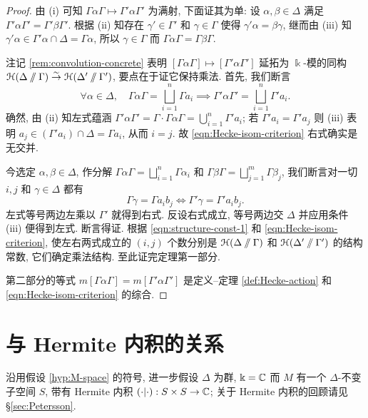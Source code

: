 \begin{proof}
	由 (i) 可知 $\Gamma\alpha\Gamma \mapsto \Gamma' \alpha\Gamma'$ 为满射, 下面证其为单: 设 $\alpha,\beta \in \Delta$ 满足 $\Gamma'\alpha\Gamma' = \Gamma'\beta\Gamma'$. 根据 (ii) 知存在 $\gamma' \in \Gamma'$ 和 $\gamma \in \Gamma$ 使得 $\gamma'\alpha = \beta\gamma$, 继而由 (iii) 知 $\gamma'\alpha \in \Gamma'\alpha \cap \Delta = \Gamma\alpha$, 所以 $\gamma \in \Gamma$ 而 $\Gamma\alpha\Gamma = \Gamma\beta\Gamma$.
	
	注记 \ref{rem:convolution-concrete} 表明 $[\Gamma\alpha\Gamma] \mapsto [\Gamma'\alpha\Gamma']$ 延拓为 $\Bbbk$-模的同构 $\EuScript{H}(\Delta \sslash \Gamma) \stackrel{\sim}{\rightarrow} \EuScript{H}(\Delta' \sslash \Gamma')$, 要点在于证它保持乘法. 首先, 我们断言
	\begin{equation}\label{eqn:Hecke-isom-criterion}
		\forall \alpha \in \Delta, \quad \Gamma \alpha \Gamma = \bigsqcup_{i=1}^n \Gamma a_i \implies \Gamma' \alpha \Gamma' = \bigsqcup_{i=1}^n \Gamma' a_i.
	\end{equation}
	确然, 由 (ii) 知左式蕴涵 $\Gamma' \alpha \Gamma' = \Gamma \cdot \Gamma\alpha\Gamma = \bigcup_{i=1}^n \Gamma' a_i$; 若 $\Gamma' a_i = \Gamma' a_j$ 则 (iii) 表明 $a_j \in (\Gamma' a_i) \cap \Delta = \Gamma a_i$, 从而 $i=j$. 故 \eqref{eqn:Hecke-isom-criterion} 右式确实是无交并.
	
	今选定 $\alpha, \beta \in \Delta$, 作分解 $\Gamma\alpha\Gamma = \bigsqcup_{i=1}^n \Gamma \alpha_i$ 和 $\Gamma\beta\Gamma = \bigsqcup_{j=1}^m \Gamma\beta_j$, 我们断言对一切 $i, j$ 和 $\gamma \in \Delta$ 都有
	\[ \Gamma \gamma = \Gamma a_i b_j \iff \Gamma' \gamma = \Gamma' a_i b_j. \]
	左式等号两边左乘以 $\Gamma'$ 就得到右式. 反设右式成立, 等号两边交 $\Delta$ 并应用条件 (iii) 便得到左式. 断言得证. 根据 \eqref{eqn:structure-const-1} 和 \eqref{eqn:Hecke-isom-criterion}, 使左右两式成立的 $(i,j)$ 个数分别是 $\EuScript{H}(\Delta \sslash \Gamma)$ 和 $\EuScript{H}(\Delta' \sslash \Gamma')$ 的结构常数, 它们确定乘法结构. 至此证完定理第一部分.
	
	第二部分的等式 $m [\Gamma \alpha \Gamma] = m[\Gamma'\alpha\Gamma']$ 是定义--定理 \ref{def:Hecke-action} 和 \eqref{eqn:Hecke-isom-criterion} 的综合.
\end{proof}

\section{与 Hermite 内积的关系}\label{sec:Hermitian-form}
沿用假设 \ref{hyp:M-space} 的符号, 进一步假设 $\Delta$ 为群, $\Bbbk=\mathbb{C}$ 而 $M$ 有一个 $\Delta$-不变子空间 $S$, 带有 Hermite 内积 $\left( \cdot \middle| \cdot \right): S \times S \to \mathbb{C}$; 关于 Hermite 内积的回顾请见 \S\ref{sec:Petersson}.

